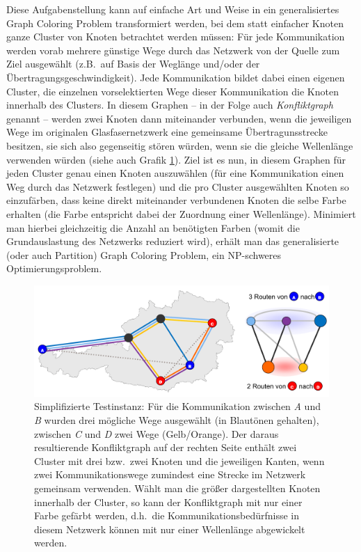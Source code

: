\documentclass[paper=a4,fontsize=12pt]{scrartcl}
\begin{document}
Diese Aufgabenstellung kann auf einfache Art und Weise in ein generalisiertes Graph Coloring Problem transformiert werden, bei dem statt einfacher Knoten ganze Cluster von Knoten betrachtet werden müssen: Für jede Kommunikation werden vorab mehrere günstige Wege durch das Netzwerk von der Quelle zum Ziel ausgewählt (z.B.\ auf Basis der Weglänge und/oder der Übertragungsgeschwindigkeit). Jede Kommunikation bildet dabei einen eigenen Cluster, die einzelnen vorselektierten Wege dieser Kommunikation die Knoten innerhalb des Clusters. In diesem Graphen -- in der Folge auch \emph{Konfliktgraph} genannt -- werden zwei Knoten dann miteinander verbunden, wenn die jeweiligen Wege im originalen Glasfasernetzwerk eine gemeinsame Übertragunsstrecke besitzen, sie sich also gegenseitig stören würden, wenn sie die gleiche Wellenlänge verwenden würden (siehe auch Grafik \ref{fig:translation}). Ziel ist es nun, in diesem Graphen für jeden Cluster genau einen Knoten auszuwählen (für eine Kommunikation einen Weg durch das Netzwerk festlegen) und die pro Cluster ausgewählten Knoten so einzufärben, dass keine direkt miteinander verbundenen Knoten die selbe Farbe erhalten (die Farbe entspricht dabei der Zuordnung einer Wellenlänge). Minimiert man hierbei gleichzeitig die Anzahl an benötigten Farben (womit die Grundauslastung des Netzwerks reduziert wird), erhält man das generalisierte (oder auch Partition) Graph Coloring Problem, ein NP-schweres Optimierungsproblem.

\begin{figure}
    \includegraphics[width=1.0\textwidth]{../img/translation.pdf}
    \caption[Simplifizierte Testinstanz]{Simplifizierte Testinstanz: Für die Kommunikation zwischen \emph{A} und \emph{B} wurden drei mögliche Wege ausgewählt (in Blautönen gehalten), zwischen \emph{C} und \emph{D} zwei Wege (Gelb/Orange). Der daraus resultierende Konfliktgraph auf der rechten Seite enthält zwei Cluster mit drei bzw.\ zwei Knoten und die jeweiligen Kanten, wenn zwei Kommunikationswege zumindest eine Strecke im Netzwerk gemeinsam verwenden. Wählt man die größer dargestellten Knoten innerhalb der Cluster, so kann der Konfliktgraph mit nur einer Farbe gefärbt werden, d.h.\ die Kommunikationsbedürfnisse in diesem Netzwerk können mit nur einer Wellenlänge abgewickelt werden.}
    \label{fig:translation}
\end{figure}
\end{document}
